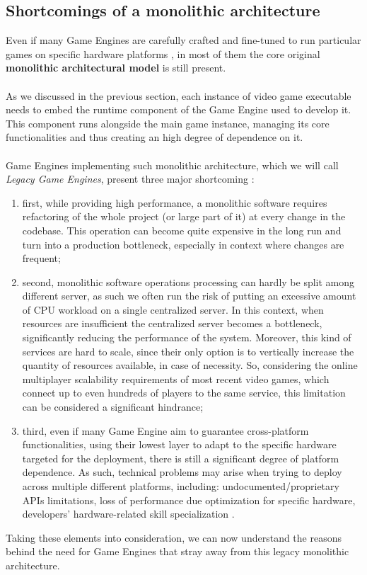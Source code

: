 \subsection{Shortcomings of a monolithic architecture}
Even if many Game Engines are carefully crafted and fine-tuned to run particular games on specific hardware platforms \cite{womak:gregory-game-engine}, in most of them the core original \textbf{monolithic architectural model} is still present. \\ \\
As we discussed in the previous section, each instance of video game executable needs to embed the runtime component of the Game Engine used to develop it. This component runs alongside the main game instance, managing its core functionalities and thus creating an high degree of dependence on it. \\ \\
Game Engines implementing such monolithic architecture, which we will call \textit{Legacy Game Engines}, present three major shortcoming \cite{womak:revamping-cloud-games}:
\begin{enumerate}
	\item first, while providing high performance, a monolithic software requires refactoring of the whole project (or large part of it) at every change in the codebase. This operation can become quite expensive in the long run and turn into a production bottleneck, especially in context where changes are frequent;
	\item second, monolithic software operations processing can hardly be split among different server, as such we often run the risk of putting an excessive amount of CPU workload on a single centralized server. In this context, when resources are insufficient the centralized server becomes a bottleneck, significantly reducing the performance of the system. Moreover, this kind of services are hard to scale, since their only option is to vertically increase the quantity of resources available, in case of necessity. So, considering the online multiplayer scalability requirements of most recent video games, which connect up to even hundreds of players \cite{site:mmo-wiki} to the same service, this limitation can be considered a significant hindrance;
	\item third, even if many Game Engine aim to guarantee cross-platform functionalities, using their lowest layer to adapt to the specific hardware targeted for the deployment, there is still a significant degree of platform dependence. As such, technical problems may arise when trying to deploy across multiple different platforms, including: undocumented/proprietary APIs limitations, loss of performance due optimization for specific hardware, developers' hardware-related skill specialization \cite{womak:smash-distributed-game-engine}.
\end{enumerate}
Taking these elements into consideration, we can now understand the reasons behind the need for Game Engines that stray away from this legacy monolithic architecture.


